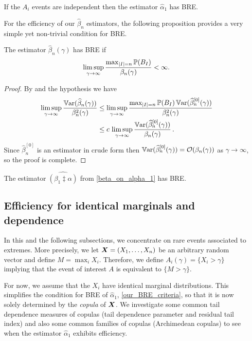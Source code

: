 \begin{example}
   If the $A_i$ events are independent then the estimator $\hat{\alpha}_1$ has BRE.
\end{example}

For the efficiency of our $\hat{\beta}_n$ estimators,
the following proposition provides a very simple yet non-trivial condition for BRE.
\begin{proposition}
 The estimator $\hat{\beta}_n(\gamma)$ has BRE if
 \begin{equation*}
  \limsup_{\gamma\to\infty}\frac{\max_{\lvert I\rvert=n}\operatorname{{\mathbb P}}(B_I)}{\beta_n(\gamma)}<\infty.
 \end{equation*}
\end{proposition}
\begin{proof}
By  and the hypothesis we have
\begin{align*}
 \limsup_{\gamma\to\infty}\frac{\operatorname{\mathbb{V}\mathrm{ar}} (\widehat{\beta}_n(\gamma) )}{\beta_n^2(\gamma)}
 &\le  \limsup_{\gamma\to\infty}\frac{\max_{\lvert I\rvert=n}\operatorname{{\mathbb P}}(B_I)\operatorname{\mathbb{V}\mathrm{ar}} ( \widehat{\beta}_n^{[0]}(\gamma) )}{\beta_n^2(\gamma)}\\
 &\le c\, \limsup_{\gamma\to\infty}\frac{\operatorname{\mathbb{V}\mathrm{ar}}( \widehat{\beta}_n^{[0]}(\gamma) )}{\beta_n(\gamma)} \,.
\end{align*}
Since $\hat{\beta}_n^{[0]}$ is an estimator in crude form
then $\operatorname{\mathbb{V}\mathrm{ar}}( \widehat{\beta}_n^{[0]}(\gamma) )={\mathcal{O}}(\beta_n(\gamma))$ as $\gamma \to \infty$, so the proof
is complete.
\end{proof}
\begin{corollary}
 The estimator $\widehat{(\beta_1 \ddagger \alpha)}$ from \eqref{beta_on_alpha_1} has BRE.
\end{corollary}

\subsection{Efficiency for identical marginals and dependence} \label{scn:ident_margs}

In this and the following subsections, we concentrate on rare events associated to
extremes.  More precisely, we let $\bm{X} = (X_1,\dots,X_n)$ be an arbitrary random vector and define
$M=\max_i X_i$.  Therefore, we define $A_i(\gamma)=\{X_i> \gamma\}$ implying that the event of interest $A$ is equivalent to $\{M>\gamma\}$.

For now, we assume that the $X_i$ have identical marginal distributions. This simplifies the condition for BRE of $\hat{\alpha}_1$, \eqref{our_BRE_criteria}, so that it is now solely determined by the \emph{copula} of $\bm{X}$. We investigate some common tail dependence measures of copulas (tail dependence parameter and residual tail index) and also some common families of copulas (Archimedean copulas) to see when the estimator $\hat{\alpha}_1$ exhibits efficiency.


